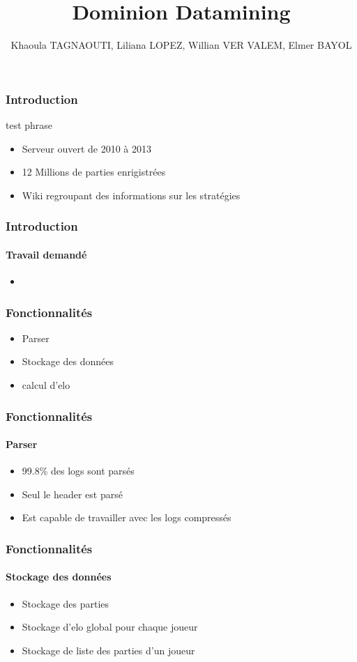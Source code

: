 \documentclass{beamer}
\title{Dominion Datamining}
\author{Khaoula TAGNAOUTI, Liliana LOPEZ, Willian VER VALEM, Elmer BAYOL}
\begin{document}
\maketitle

\begin{frame}
  \frametitle{Introduction}
  test phrase
  \begin{itemize}
    \item Serveur ouvert de 2010 à 2013
    \item 12 Millions de parties enrigistrées
    \item Wiki regroupant des informations sur les stratégies
  \end{itemize}

\end{frame}

\begin{frame}
  \frametitle{Introduction}
  \framesubtitle{Travail demandé}
  \begin{itemize}
    \item 
  \end{itemize}
\end{frame}
  
\begin{frame}
  \frametitle{Fonctionnalités}
  \begin{itemize}
  \item Parser
  \item Stockage des données
  \item calcul d'elo
  \end{itemize}
\end{frame}

\begin{frame}
  \frametitle{Fonctionnalités}
  \framesubtitle{Parser}
  \begin{itemize}
  \item 99.8\% des logs sont parsés
  \item Seul le header est parsé
  \item Est capable de travailler avec les logs compressés
  \end{itemize}
\end{frame}

\begin{frame}
  \frametitle{Fonctionnalités}
  \framesubtitle{Stockage des données}
  \begin{itemize}
  \item Stockage des parties
  \item Stockage d'elo global pour chaque joueur
  \item Stockage de liste des parties d'un joueur
  \end{itemize}
\end{frame}
\end{document}
